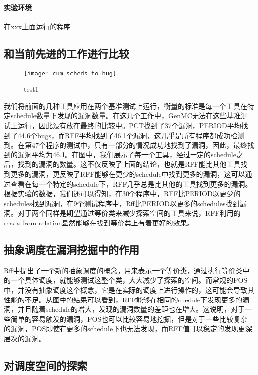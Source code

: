 \paragraph{实验环境}在xxx上面运行的程序

\subsection{和当前先进的工作进行比较}

\begin{figure}[ht]
    \centering
    \texttt{[image: cum-scheds-to-bug]}
    \caption{\label{fig:test1}test1}
\end{figure}

我们将前面的几种工具应用在两个基准测试上运行，衡量的标准是每一个工具在特定schedule数量下发现的漏洞数量。在这几个工作中，GenMC无法在这些基准测试上运行，因此没有放在最终的比较中。PCT找到了37个漏洞，PERIOD平均找到了44.6个bugs，而RFF平均找到了46.1个漏洞，这几乎是所有程序都成功检测到。在第47个程序的测试中，只有一部分的情况成功地找到了漏洞，因此，最终找到的漏洞平均为46.1。在图中，我们展示了每一个工具，经过一定的schedule之后，找到的漏洞的数量。这不仅反映了上面的结论，也就是RFF能比其他工具找到更多的漏洞，更反映了RFF能够在更少的schedule中找到更多的漏洞，这可以通过查看在每一个特定的schedule下，RFF几乎总是比其他的工具找到更多的漏洞。根据实验的数据，我们还可以得知，在30个程序中，RFF比PERIOD以更少的schedules找到漏洞，在9个测试程序中，Rff比PERIOD以更多的schedules找到漏洞。对于两个同样是期望通过等价类来减少探索空间的工具来说，RFF利用的reads-from relation显然能够在找到等价类上有着更好的效果。

\subsection{抽象调度在漏洞挖掘中的作用}

Rff中提出了一个新的抽象调度的概念，用来表示一个等价类，通过执行等价类中的一个具体调度，就能够测试这整个类，大大减少了探索的空间。而常规的POS中，并没有抽象调度这个概念，它是在实际的调度上进行操作的，这可能会导致其性能的不足。从图中的结果可以看到，RFF能够在相同的chedule下发现更多的漏洞，并且随着schedule的增大，发现的漏洞数量的差距也在增大。这说明，对于一些简单的容易触发的漏洞，POS也可以比较容易地挖掘，但是对于一些比较复杂的漏洞，POS即使在更多的schedule下也无法发现，而RFF值可以稳定的发现更深层次的漏洞。

\subsection{对调度空间的探索}

